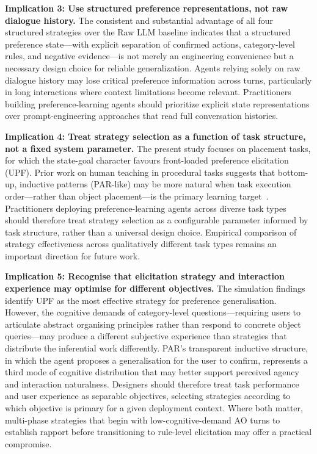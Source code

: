 \documentclass[manuscript,review,anonymous]{acmart}
\begin{document}
{\textbf{Implication 3: Use structured preference representations, not raw dialogue history.} The consistent and substantial advantage of all four structured strategies over the Raw LLM baseline indicates that a structured preference state---with explicit separation of confirmed actions, category-level rules, and negative evidence---is not merely an engineering convenience but a necessary design choice for reliable generalization. Agents relying solely on raw dialogue history may lose critical preference information across turns, particularly in long interactions where context limitations become relevant. Practitioners building preference-learning agents should prioritize explicit state representations over prompt-engineering approaches that read full conversation histories.

\textbf{Implication 4: Treat strategy selection as a function of task structure, not a fixed system parameter.} The present study focuses on placement tasks, for which the state-goal character favours front-loaded preference elicitation (UPF). Prior work on human teaching in procedural tasks suggests that bottom-up, inductive patterns (PAR-like) may be more natural when task execution order---rather than object placement---is the primary learning target~\cite{dai2024think,racca2018active}. Practitioners deploying preference-learning agents across diverse task types should therefore treat strategy selection as a configurable parameter informed by task structure, rather than a universal design choice. Empirical comparison of strategy effectiveness across qualitatively different task types remains an important direction for future work.

\textbf{Implication 5: Recognise that elicitation strategy and interaction experience may optimise for different objectives.} The simulation findings identify UPF as the most effective strategy for preference generalisation. However, the cognitive demands of category-level questions---requiring users to articulate abstract organising principles rather than respond to concrete object queries---may produce a different subjective experience than strategies that distribute the inferential work differently. PAR's transparent inductive structure, in which the agent proposes a generalisation for the user to confirm, represents a third mode of cognitive distribution that may better support perceived agency and interaction naturalness. Designers should therefore treat task performance and user experience as separable objectives, selecting strategies according to which objective is primary for a given deployment context. Where both matter, multi-phase strategies that begin with low-cognitive-demand AO turns to establish rapport before transitioning to rule-level elicitation may offer a practical compromise.

}
\end{document}
